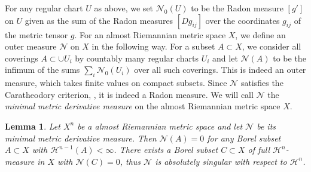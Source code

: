 \documentclass[12pt,leqno,intlimits]{amsart}
\numberwithin{equation}{section}
\newtheorem{lem}[thm]{Lemma}
\theoremstyle{definition}
\theoremstyle{remark}
\begin{document}
For any regular chart $U$ as above, we set $\mathcal N_0 (U)$ to be the Radon measure $[g']$ on $U$ given as the sum of
the Radon measures $[D g_{ij}]$ over the coordinates $ g_{ij}$ of the metric tensor $g$.
For an almost Riemannian metric space $X$, we define an outer measure $\mathcal N$ on $X$  in the following way.
For a subset $A\subset X$, we consider all  coverings $A\subset \cup U_i$ by  countably many regular charts $U_i$ and let $\mathcal N(A)$
to be the infimum of the sums $\sum_i \mathcal N_0 (U_i)$  over all such coverings.  This is indeed an outer measure, which takes finite values on compact subsets.  Since $\mathcal N$  satisfies the Caratheodory criterion, \cite[Theorem 1.9]{Evans},  it is indeed a Radon measure.  We will call $\mathcal N$ the \emph{minimal metric derivative measure} on the almost Riemannian metric space $X$.


\begin{lem} \label{lem:minderiv}
Let $X^n$ be a almost Riemannian metric space and let $\mathcal N$ be its minimal  metric derivative measure.
Then $\mathcal N (A)=0$ for any Borel subset $A\subset X$ with $\mathcal H^{n-1} (A)<\infty$.
There exists a Borel subset $C\subset X$ of full $\mathcal H^n$-measure in $X$ with
$\mathcal N(C)=0$, thus $\mathcal N$ is absolutely singular with respect to $\mathcal H^n$.
\end{lem}
\end{document}
